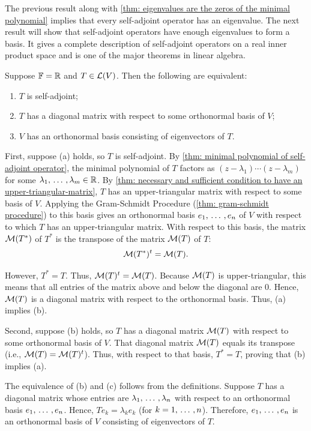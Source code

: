 The previous result along with \ref{thm: eigenvalues are the zeros of the minimal polynomial} implies that every self-adjoint operator has an eigenvalue. The next result will show that self-adjoint operators have enough eigenvalues to form a basis. It gives a complete description of self-adjoint operators on a real inner product space and is one of the major theorems in linear algebra.

\begin{thm}
  \label{thm: real spectral theorem}
  Suppose $\mathbb{F} = \mathbb{R}$ and $T \in \mathcal{L} (V)$. Then the following are equivalent:
  \begin{enumerate}[label=\textbf{(\alph*)}]
    \item $T$ is self-adjoint;
    \item $T$ has a diagonal matrix with respect to some orthonormal basis of $V$;
    \item $V$ has an orthonormal basis consisting of eigenvectors of $T$.
  \end{enumerate}
\end{thm}
\begin{prf}
  \StepOne First, suppose (a) holds, so $T$ is self-adjoint.
  By \ref{thm: minimal polynomial of self-adjoint operator}, the minimal polynomial of $T$ factors as $(z-\lambda_1)\cdots(z-\lambda_m)$ for some $\lambda_1, {\, \ldots \,\,}, \lambda_m \in \mathbb{R}$.
  By \ref{thm: necessary and sufficient condition to have an upper-triangular-matrix}, $T$ has an upper-triangular matrix with respect to some basis of $V$.
  Applying the Gram-Schmidt Procedure (\ref{thm: gram-schmidt procedure}) to this basis gives an orthonormal basis $e_1, {\, \ldots \,\,}, e_n$ of $V$ with respect to which $T$ has an upper-triangular matrix.
  With respect to this basis, the matrix $\mathcal{M}(T^*)$ of $T^*$ is the transpose of the matrix $\mathcal{M}(T)$ of $T$:
  \[
  \mathcal{M}(T^*)^t = \mathcal{M}(T).
  \]

  However, $T^*=T$. Thus, $\mathcal{M}(T)^t=\mathcal{M}(T)$. Because $\mathcal{M}(T)$ is upper-triangular, this means that all entries of the matrix above and below the diagonal are $0$. Hence, $\mathcal{M}(T)$ is a diagonal matrix with respect to the orthonormal basis. Thus, (a) implies (b).

  \StepTwo Second, suppose (b) holds, so $T$ has a diagonal matrix $\mathcal{M}(T)$ with respect to some orthonormal basis of $V$. That diagonal matrix $\mathcal{M}(T)$ equals its transpose (i.e., $\mathcal{M}(T)= \mathcal{M}(T)^t$). Thus, with respect to that basis, $T^*=T$, proving that (b) implies (a).

  \StepThree The equivalence of (b) and (c) follows from the definitions. Suppose $T$ has a diagonal matrix whose entries are $\lambda_1, {\, \ldots \,\,}, \lambda_n$ with respect to an orthonormal basis $e_1, {\, \ldots \,\,}, e_n$. Hence, $Te_k = \lambda_k e_k$ (for $k = 1, {\, \ldots \,\,}, n$). Therefore, $e_1, {\, \ldots \,\,}, e_n$ is an orthonormal basis of $V$ consisting of eigenvectors of $T$.
\end{prf}

